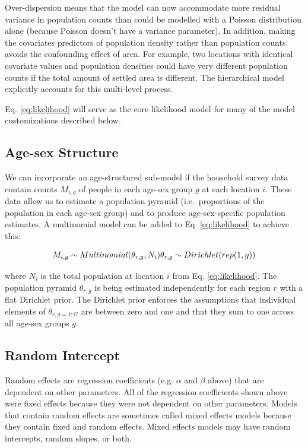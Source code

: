 \documentclass[]{book}
\begin{document}
Over-dispersion means that the model can now accommodate more residual
variance in population counts than could be modelled with a Poisson
distribution alone (because Poisson doesn't have a variance parameter).
In addition, making the covariates predictors of population density
rather than population counts avoids the confounding effect of area. For
example, two locations with identical covariate values and population
densities could have very different population counts if the total
amount of settled area is different. The hierarchical model explicitly
accounts for this multi-level process.

Eq. \eqref{eq:likelihood} will serve as the core likelihood model for many
of the model customizations described below.

\subsection{Age-sex Structure}\label{age-sex-structure}

We can incorporate an age-structured sub-model if the household survey
data contain counts \(M_{i,g}\) of people in each age-sex group \(g\) at
each location \(i\). These data allow us to estimate a population
pyramid (i.e.~proportions of the population in each age-sex group) and
to produce age-sex-specific population estimates. A multinomial model
can be added to Eq. \eqref{eq:likelihood} to achieve this:

\begin{equation}
  M_{i,g} \sim Multinomial(\theta_{r,g}, N_i) \\
  \theta_{r,g} \sim Dirichlet(rep(1,g))
  \label{eq:agesex}
\end{equation}

where \(N_i\) is the total population at location \(i\) from Eq.
\eqref{eq:likelihood}. The population pyramid \(\theta_{r,g}\) is being
estimated independently for each region \(r\) with a flat Dirichlet
prior. The Dirichlet prior enforces the assumptions that individual
elements of \(\theta_{r,g=1:G}\) are between zero and one and that they
sum to one across all age-sex groups \(g\).

\subsection{Random Intercept}\label{random-intercept}

Random effects are regression coefficients (e.g. \(\alpha\) and
\(\beta\) above) that are dependent on other parameters. All of the
regression coefficients shown above were fixed effects because they were
not dependent on other parameters. Models that contain random effects
are sometimes called mixed effects models because they contain fixed and
random effects. Mixed effects models may have random intercepts, random
slopes, or both.
\end{document}
